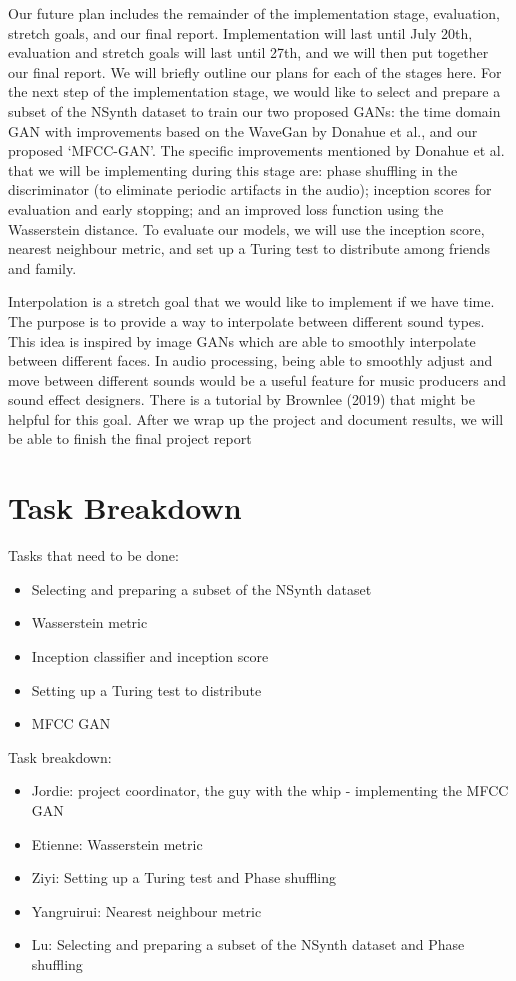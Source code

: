 \documentclass{article} %
\begin{document}
Our future plan includes the remainder of the implementation stage, evaluation, stretch goals, and our final report. Implementation will last until July 20th, evaluation and stretch goals will last until 27th, and we will then put together our final report. We will briefly outline our plans for each of the stages here. 
For the next step of the implementation stage, we would like to select and prepare a subset of the NSynth dataset to train our two proposed GANs: the time domain GAN with improvements based on the WaveGan by Donahue et al., and our proposed ‘MFCC-GAN’. The specific improvements mentioned by Donahue et al. that we will be implementing during this stage are: phase shuffling in the discriminator (to eliminate periodic artifacts in the audio); inception scores for evaluation and early stopping; and an improved loss function using the Wasserstein distance. To evaluate our models, we will use the inception score, nearest neighbour metric, and set up a Turing test to distribute among friends and family.

Interpolation is a stretch goal that we would like to implement if we have time. The purpose is to provide a way to interpolate between different sound types. This idea is inspired by image GANs which are able to smoothly interpolate between different faces. In audio processing, being able to smoothly adjust and move between different sounds would be a useful feature for music producers and sound effect designers. There is a tutorial by Brownlee (2019) that might be helpful for this goal. After we wrap up the project and document results, we will be able to finish the final project report
\section{Task Breakdown}
\qquad Tasks that need to be done:
\begin{itemize}
  \item Selecting and preparing a subset of the NSynth dataset
  \item Wasserstein metric
  \item Inception classifier and inception score
  \item Setting up a Turing test to distribute
  \item MFCC GAN
\end{itemize}
\qquad Task breakdown:
\begin{itemize}
  \item Jordie: project coordinator, the guy with the whip - implementing the MFCC GAN
  \item Etienne: Wasserstein metric
  \item Ziyi: Setting up a Turing test and Phase shuffling
  \item Yangruirui: Nearest neighbour metric
  \item Lu: Selecting and preparing a subset of the NSynth dataset and Phase shuffling
\end{itemize}
\end{document}
